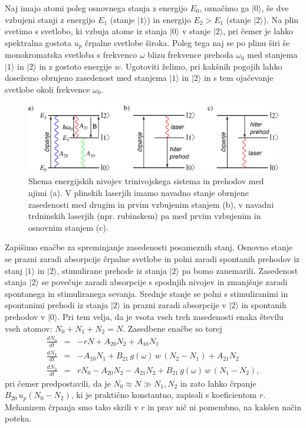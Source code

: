 Naj imajo atomi poleg osnovnega stanja z energijo $E_0$, označimo ga $|0\rangle$,
še dve vzbujeni stanji z energijo $E_1$ (stanje $|1\rangle$) in energijo $E_2>E_1$
(stanje $|2\rangle$). Na plin svetimo s svetlobo, ki
vzbuja atome iz stanja $|0\rangle$ v stanje $|2\rangle$, pri čemer
je lahko spektralna gostota $u_{p}$ črpalne svetlobe široka. Poleg
tega naj se po plinu širi še monokromatska svetloba s frekvenco $\omega$
blizu frekvence prehoda $\omega_{0}$ med stanjema $|1\rangle$ in
$|2\rangle$ in z gostoto energije $w$. Ugotoviti želimo, pri kakšnih
pogojih lahko dosežemo obrnjeno zasedenost med stanjema $|1\rangle$ in $|2\rangle$
in s tem ojačevanje svetlobe okoli frekvence $\omega_{0}$.
\begin{figure}[h]
\centering
\includegraphics[width=14truecm]{slike/05_Trinivojski.png}
\caption{Shema energijskih nivojev trinivojskega sistema in prehodov med njimi (a).
V plinskih laserjih imamo navadno stanje obrnjene zasedenosti med drugim in prvim
vzbujenim stanjem (b), v navadni trdninskih laserjih (npr. rubinskem) pa med 
prvim vzbujenim in osnovnim stanjem (c).}
\label{fig:3nivojski}
\end{figure}


Zapišimo enačbe za spreminjanje zasedenosti posameznih stanj. Osnovno stanje
se prazni zaradi absorpcije črpalne svetlobe in polni zaradi
spontanih prehodov iz stanj $|1\rangle$ in $|2\rangle$, stimulirane
prehode iz stanja $|2\rangle$ pa bomo zanemarili. Zasedenost stanja $|2\rangle$ se
povečuje zaradi absorpcije s spodnjih nivojev in zmanjšuje
zaradi spontanega in stimuliranega sevanja. Srednje stanje se polni
s stimuliranimi in spontanimi prehodi iz stanja $|2\rangle$ in prazni
zaradi absorpcije v $|2\rangle$ in spontanih prehodov v $|0\rangle$.
Pri tem velja, da je vsota vseh treh zasedenosti enaka številu vseh atomov: $N_{0}+N_{1}+N_{2}=N$. 
Zasedbene enačbe so torej 
\begin{eqnarray}
\frac{dN_{0}}{dt} & = & -rN+A_{20}N_{2}+A_{10}N_{1} \label{4.39.1}\\
\frac{dN_{1}}{dt} & = & -A_{10}N_{1}+B_{21}\,g(\omega)\,w\, (N_{2}-N_{1})+A_{21}N_{2} \label{4.39.2}\\
\frac{dN_{2}}{dt} & = & rN_0-A_{20}N_{2}-A_{21}N_{2}+B_{21}\,g(\omega)\,w\, (N_1-N_2),
\label{4.39}
\end{eqnarray}
pri čemer predpostavili, da je $N_0 \approx N \gg N_1, N_2$ in zato lahko črpanje $B_{20}\, 
u_{p} (N_0-N_2)$, ki je praktično konstantno, zapisali s koeficientom $r$. Mehanizem črpanja 
smo tako skrili v $r$ in prav nič ni pomembno, na kakšen način poteka. 


